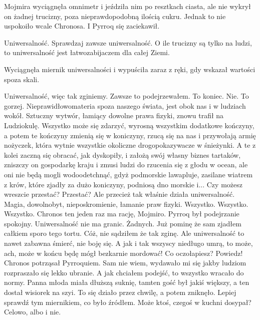 Mojmira wyciągnęła omnimetr i jeździła nim po resztkach ciasta, ale nie wykrył on żadnej trucizny, poza nieprawdopodobną ilością cukru.
Jednak to nie uspokoiło wcale Chronosa. I Pyrroq się zaciekawił.

\begin{dialogue}
\ds{} Uniwersalność. Sprawdzaj zawsze uniwersalność. O ile trucizny są tylko na ludzi, to uniwersalność jest łatwozabijaczem dla całej Ziemi.
\end{dialogue}

Wyciągnęła miernik uniwersalności i wypuściła zaraz z ręki, gdy wskazał wartości spoza skali.

\begin{dialogue}
\ds{} Uniwersalność, więc tak zginiemy. Zawsze to podejrzewałem. To koniec. Nie. To gorzej. Nieprawidłowomateria spoza naszego świata, jest obok nas i w ludziach wokół.
Sztuczny wytwór, łamiący dowolne prawa fizyki, znowu trafił na Ludziokulę.
Wszystko może się zdarzyć, wyrosną wszystkim dodatkowe kończyny, a potem te kończyny zmienią się w koniczyny, 
rzucą się na nas i przywołają armię nożyczek, która wytnie wszystkie okoliczne drogopokazywacze w śnieżynki. 
A te z kolei zaczną się obracać, jak dyskopiły, i założą swój własny biznes tartaków, 
zniszczy on gospodarkę kraju i zmusi ludzi do rzucenia się z głodu w ocean, ale oni nie będą mogli wodoodetchnąć, 
gdyż podmorskie lawapluje, zasilane wiatrem z krów, które zjadły za dużo koniczyny, podniosą dno morskie i...
\ds{} Czy możesz wreszcie przestać?
\ds{} Przestać? Ale przecież tak właśnie działa uniwersalność. Magia, dowolnobyt, nieposkromienie, łamanie praw fizyki. Wszystko. Wszystko. Wszystko.
\ds{} Chronos ten jeden raz ma rację, Mojmiro. \dm{} Pyrroq był podejrzanie spokojny. \dm{} Uniwersalność nie ma granic. Żadnych. 
Już pominę że sam zjadłem całkiem sporo tego tortu. Cóż, nie sądziłem że tak zginę. Ale uniwersalność to nawet zabawna śmierć, nie boję się. 
A jak i tak wszyscy niedługo umrą, to może, ach, może w końcu będę mógł bezkarnie mordować!
\ds{} Co oczołapiesz? Powiedz! \dm{} Chronos potrząsał Pyrroquiem.
\ds{} Sam nie wiem, wydawało mi się jakby ludziom rozpraszało się lekko ubranie. A jak chciałem podejść, to wszystko wracało do normy.
Panna młoda miała dłuższą suknię, tamten gość był jakiś większy, a ten dostał wisiorek na szyi. To się działo przez chwilę, a potem zniknęło.
Lepiej sprawdź tym miernikiem, co było źródłem. Może ktoś, czegoś w kuchni dosypał? Celowo, albo i nie.
\end{dialogue}

